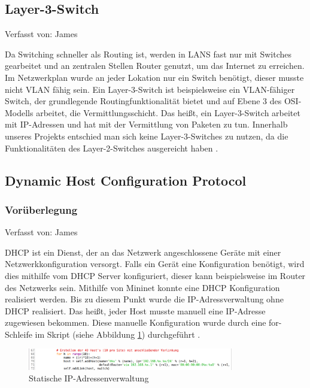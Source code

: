 \documentclass[fontsize=12pt,paper=a4,open=any,parskip=half,
  twoside=false,toc=listof,toc=bibliography,fleqn,leqno,
  captions=nooneline,captions=tableabove,british]{scrbook}
\begin{document}
\subsection{Layer-3-Switch}
{\tiny Verfasst von: James\par}
Da Switching schneller als Routing ist, werden in LANS fast nur mit Switches gearbeitet und an zentralen Stellen Router genutzt, um das Internet zu erreichen. Im Netzwerkplan wurde an jeder Lokation nur ein Switch benötigt, dieser musste nicht VLAN fähig sein. Ein Layer-3-Switch ist beispielsweise ein VLAN-fähiger Switch, der grundlegende Routingfunktionalität bietet und auf Ebene 3 des OSI-Modells arbeitet, die Vermittlungsschicht. Das heißt, ein Layer-3-Switch arbeitet mit IP-Adressen und hat mit der Vermittlung von Paketen zu tun. Innerhalb unseres Projekts entschied man sich keine Layer-3-Switches zu nutzen, da die Funktionalitäten des Layer-2-Switches ausgereicht haben \cite{baun2019grundlagen}.


\subsection{Dynamic Host Configuration Protocol}
\subsubsection{Vorüberlegung}
{\tiny Verfasst von: James\par}
DHCP ist ein Dienst, der an das Netzwerk angeschlossene Geräte mit einer Netzwerkkonfiguration versorgt. Falls ein Gerät eine Konfiguration benötigt, wird dies mithilfe vom DHCP Server konfiguriert, dieser kann beispielsweise im Router des Netzwerks sein. Mithilfe von Mininet konnte eine DHCP Konfiguration realisiert werden. Bis zu diesem Punkt wurde die IP-Adressverwaltung ohne DHCP realisiert. Das heißt, jeder Host musste manuell eine IP-Adresse zugewiesen bekommen. Diese manuelle Konfiguration wurde durch eine for-Schleife im Skript (siehe Abbildung \ref{fororig}) durchgeführt \cite{baun2019grundlagen}.

\begin{figure}[H]
 \centering
 \includegraphics[width=0.8\textwidth]{Bilder/fororig}
 \captionsetup{justification=centering}
 \caption{Statische IP-Adressenverwaltung}
 \label{fororig}
\end{figure}
\end{document}
